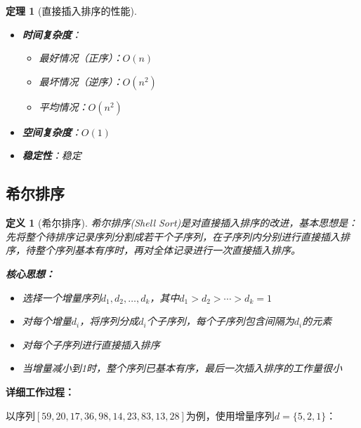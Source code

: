 \documentclass[12pt,a4paper]{amsart}
\newtheorem{definition}{定义}[section]
\newtheorem{theorem}{定理}[section]
\begin{document}
\begin{theorem}[直接插入排序的性能]
    \indent
\begin{itemize}
\item \textbf{时间复杂度}：
    \begin{itemize}
    \item 最好情况（正序）：$O(n)$
    \item 最坏情况（逆序）：$O(n^2)$
    \item 平均情况：$O(n^2)$
    \end{itemize}
\item \textbf{空间复杂度}：$O(1)$
\item \textbf{稳定性}：稳定
\end{itemize}
\end{theorem}

\subsection{希尔排序}

\begin{definition}[希尔排序]
希尔排序(Shell Sort)是对直接插入排序的改进，基本思想是：先将整个待排序记录序列分割成若干个子序列，在子序列内分别进行直接插入排序，待整个序列基本有序时，再对全体记录进行一次直接插入排序。

\textbf{核心思想：}
\begin{itemize}
\item 选择一个增量序列$d_1, d_2, \ldots, d_k$，其中$d_1 > d_2 > \cdots > d_k = 1$
\item 对每个增量$d_i$，将序列分成$d_i$个子序列，每个子序列包含间隔为$d_i$的元素
\item 对每个子序列进行直接插入排序
\item 当增量减小到1时，整个序列已基本有序，最后一次插入排序的工作量很小
\end{itemize}
\end{definition}

\textbf{详细工作过程：}

以序列$[59, 20, 17, 36, 98, 14, 23, 83, 13, 28]$为例，使用增量序列$d = \{5, 2, 1\}$：
\end{document}
